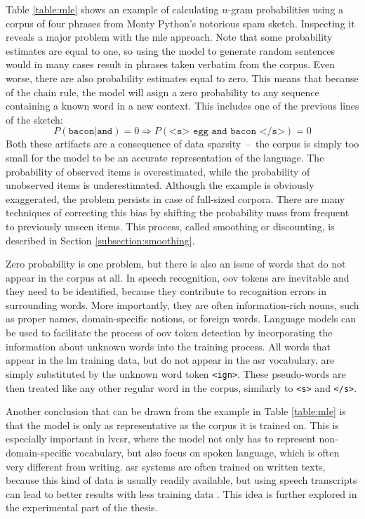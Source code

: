 Table \ref{table:mle} shows an example of calculating \mbox{$n$-gram} probabilities using a corpus of four phrases from Monty Python's notorious spam sketch. Inspecting it reveals a major problem with the \gls{mle} approach. Note that some probability estimates are equal to one, so using the model to generate random sentences would in many cases result in phrases taken verbatim from the corpus. Even worse, there are also probability estimates equal to zero. This means that because of the chain rule, the model will asign a zero probability to any sequence containing a known word in a new context. This includes one of the previous lines of the sketch:
	\begin{equation}
		P(\texttt{bacon}|\texttt{and})=0 \Rightarrow P(\texttt{<s> egg and bacon </s>})=0
	\end{equation}
	Both these artifacts are a consequence of data sparsity~--~the corpus is simply too small for the model to be an accurate representation of the language. The probability of observed items is overestimated, while the probability of unobserved items is underestimated. Although the example is obviously exaggerated, the problem persists in case of full-sized corpora. There are many techniques of correcting this bias by shifting the probability mass from frequent to previously unseen items. This process, called smoothing or discounting, is described in Section \ref{subsection:smoothing}. 

	Zero probability is one problem, but there is also an issue of words that do not appear in the corpus at all. In speech recognition, \gls{oov} tokens are inevitable and they need to be identified, because they contribute to recognition errors in surrounding words. More importantly, they are often information-rich nouns, such as proper names, domain-specific notions, or foreign words. Language models can be used to facilitate the process of \gls{oov} token detection by incorporating the information about unknown words into the training process. All words that appear in the \gls{lm} training data, but do not appear in the \gls{asr} vocabulary, are simply substituted by the unknown word token \texttt{<ign>}. These pseudo-words are then treated like any other regular word in the corpus, similarly to \texttt{<s>} and \texttt{</s>}. 

	Another conclusion that can be drawn from the example in Table \ref{table:mle} is that the model is only as representative as the corpus it is trained on. This is especially important in \gls{lvcsr}, where the model not only has to represent non-domain-specific vocabulary, but also focus on spoken language, which is often very different from writing. \gls{asr} systems are often trained on written texts, because this kind of data is usually readily available, but using speech transcripts can lead to better results with less training data \cite{dziadzio2015comparison}. This idea is further explored in the experimental part of the thesis.
